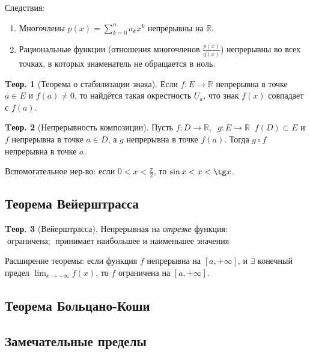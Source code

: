 \documentclass[a4paper,12pt]{article}
\numberwithin{figure}{section}
\theoremstyle{definition}
\theoremstyle{definition}
\newtheorem{theorem}{Tеор.}[section]
\def\.{\;\;}
\def\mathR{\mathbb{R}}
\def\circleone{\ding{192}$\;$}
\def\circletwo{\ding{193}$\;$}
\begin{document}
\bigbreak
Следствия: \begin{enumerate}
	\item Многочлены $\displaystyle p(x)=\sum_{k=0}^n a_kx^k$ непрерывны на $\mathR$.
	\item Рациональные функции (отношения многочленов $\displaystyle \frac{p(x)}{q(x)}$)
		  непрерывны во всех точках, в которых знаменатель не обращается в ноль.
\end{enumerate}

\begin{theorem}[Теорема о стабилизации знака]
	Если $f\!: E\to\mathR$ непрерывна в точке $a \in E$ и $f(a)\ne0$,
	то найдётся такая окрестность $U_a$, что знак $f(x)$ совпадает с $f(a)$.
\end{theorem}

\begin{theorem}[Непрерывность композиции]
	Пусть $f\!: D\to\mathR, \. g\!: E\to\mathR \. f(D)\subset E$ и
	$f$ непрерывна в точке $a\in D$, а $g$ непрерывна в точке $f(a)$.
	Тогда $g \circ f$ непрерывна в точке $a$.
\end{theorem}

Вспомогательное нер-во: если $0<x<\frac\pi2$, то $\sin x<x<\tg x$.

\subsection{Теорема Вейерштрасса}

\begin{theorem}[Вейерштрасса]
  Непрерывная на \textit{отрезке} функция: \\
	\circleone ограничена;
	\circletwo принимает наибольшее и наименьшее значения
\end{theorem}

\bigbreak
Расширение теоремы: если функция $f$ непрерывна на $[a,+\infty]$,
и $\exists$ конечный предел $\displaystyle \lim_{x\to+\infty}f(x)$,
то $f$ ограничена на $[a,+\infty]$.


\subsection{Теорема Больцано-Коши}


\subsection{Замечательные пределы}
\end{document}
